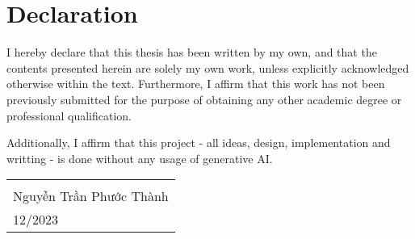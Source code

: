 \hypertarget{declaration}{%
\chapter*{Declaration}\label{declaration}}

I hereby declare that this thesis has been written by my own, and that the contents presented herein
are solely my own work, unless explicitly acknowledged otherwise within the text. Furthermore, I
affirm that this work has not been previously submitted for the purpose of obtaining any other
academic degree or professional qualification.

Additionally, I affirm that this project - all ideas, design, implementation and writting - is done
without any usage of generative AI.

\vspace{2cm}

\begin{tabular}{@{}p{4in}@{}}
\hrulefill \\
Nguyễn Trần Phước Thành \\
12/2023 \\
\end{tabular}
